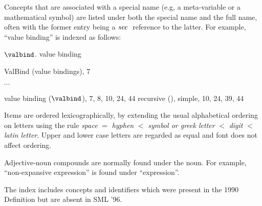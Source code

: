\begin{theindex}
Concepts
 that are associated with a
special name (e.g, a meta-variable or a mathematical symbol)
are listed under both the special name and the full name,
often with the former entry being a ${\it see\ }$ reference to the latter.
For example, ``value binding'' is indexed as follows:
\indexspace

\item $\valbind$. \see value binding
\item ValBind (value bindings), 7
\item $\cdots$
\item value binding ($\valbind$), 7, 8, 10, 24, 44
\subitem recursive (), \recrefs 
\subitem simple, 10, 24, 39, 44
\indexspace

Items are ordered lexicographically, by extending the 
usual alphabetical ordering on letters using the rule
{\it space} $=$ {\it hyphen} $<$ {\it symbol or greek letter}  $<$ {\it digit} $<$ {\it latin letter}.
Upper and lower case letters are regarded as equal and font does not affect
ordering.

Adjective-noun compounds are normally found under the noun. For example,
``non-expansive expression'' is found under ``expression''.

The index includes concepts and identifiers
which were present in the 1990 Definition but are absent in SML '96.

\indexspace


\end{theindex}
